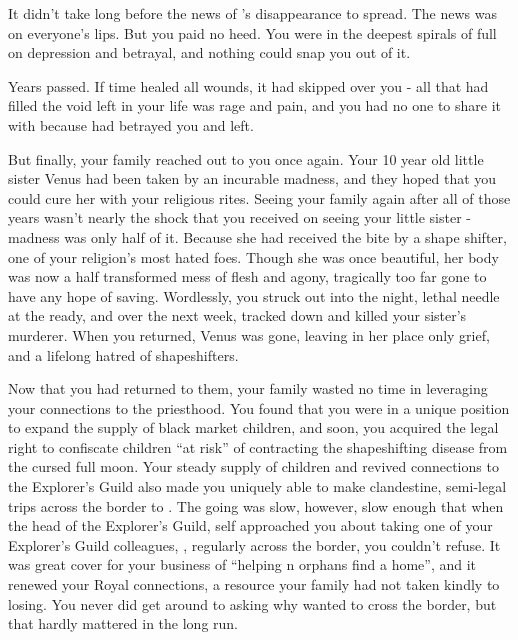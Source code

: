 \documentclass[char]{NeptuneBall}
\begin{document}
It didn't take long before the news of \cAriel{}'s disappearance to spread. The news was on everyone's lips. But you paid no heed. You were in the deepest spirals of full on depression and betrayal, and nothing could snap you out of it.

Years passed. If time healed all wounds, it had skipped over you - all that had filled the void left in your life was rage and pain, and you had no one to share it with because \emph{\cAriel{\they}} had betrayed you and left.

But finally, your family reached out to you once again. Your 10 year old little sister Venus had been taken by an incurable madness, and they hoped that you could cure her with your religious rites. Seeing your family again after all of those years wasn't nearly the shock that you received on seeing your little sister - madness was only half of it. Because she had received the bite by a shape shifter, one of your religion's most hated foes. Though she was once beautiful, her body was now a half transformed mess of flesh and agony, tragically too far gone to have any hope of saving. Wordlessly, you struck out into the night, lethal needle at the ready, and over the next week, tracked down and killed your sister's murderer. When you returned, Venus was gone, leaving in her place only grief, and a lifelong hatred of shapeshifters.

Now that you had returned to them, your family wasted no time in leveraging your connections to the priesthood. You found that you were in a unique position to expand the supply of black market children, and soon, you acquired the legal right to confiscate children ``at risk'' of contracting the shapeshifting disease from the cursed full moon. Your steady supply of children and revived connections to the Explorer's Guild also made you uniquely able to make clandestine, semi-legal trips across the border to \pPacifica{}. The going was slow, however, slow enough that when the head of the Explorer's Guild, \cPlant{\Prince} \cPlant{} \cPlant{\them}self approached you about taking one of your Explorer's Guild colleagues, \cPlant{\their} \cPrincess{\nephew}, \cPrincess{\Prince} \cPrincess{} regularly across the border, you couldn't refuse. It was great cover for your business of ``helping \pAtlantis{}n orphans find a home'', and it renewed your Royal connections, a resource your family had not taken kindly to losing. You never did get around to asking why \cPrincess{\they} wanted to cross the border, but that hardly mattered in the long run.
\end{document}
